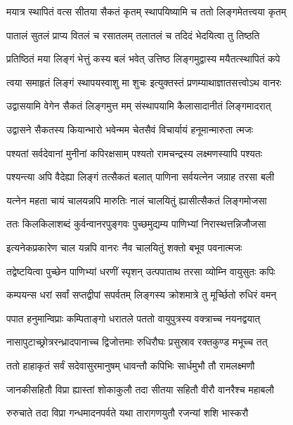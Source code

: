 \twolineshloka
{मयात्र स्थापितं वत्स सीतया सैकतं कृतम्}
{स्थापयिष्यामि च ततो लिङ्गमेतत्त्वया कृतम्}%

\twolineshloka
{पातालं सुतलं प्राप्य वितलं च रसातलम्}
{तलातलं च तदिदं भेदयित्वा तु तिष्ठति}%

\twolineshloka
{प्रतिष्ठितं मया लिङ्गं भेत्तुं कस्य बलं भवेत्}
{उत्तिष्ठ लिङ्गमुद्वास्य मयैतत्स्थापितं कपे}%

\twolineshloka
{त्वया समाहृतं लिङ्गं स्थापयस्वाशु मा शुचः}
{इत्युक्तस्तं प्रणम्याथाज्ञातसत्त्वोऽथ वानरः}%

\twolineshloka
{उद्वासयामि वेगेन सैकतं लिङ्गमुत्त मम्}
{संस्थापयामि कैलासादानीतं लिङ्गमादरात्}%

\twolineshloka
{उद्वासने सैकतस्य कियान्भारो भवेन्मम}
{चेतसैवं विचार्यायं हनूमान्मारुता त्मजः}%

\twolineshloka
{पश्यतां सर्वदेवानां मुनीनां कपिरक्षसाम्}
{पश्यतो रामचन्द्रस्य लक्ष्मणस्यापि पश्यतः}%

\twolineshloka
{पश्यन्त्या अपि वैदेह्या लिङ्गं तत्सैकतं बलात्}
{पाणिना सर्वयत्नेन जग्राह तरसा बली}%

\twolineshloka
{यत्नेन महता चायं चालयन्नपि मारुतिः}
{नालं चालयितुं ह्यासीत्सैकतं लिङ्गमोजसा}%

\twolineshloka
{ततः किलकिलाशब्दं कुर्वन्वानरपुङ्गवः}
{पुच्छमुद्यम्य पाणिभ्यां निरास्थत्तन्निजौजसा}%

\twolineshloka
{इत्यनेकप्रकारेण चाल यन्नपि वानरः}
{नैव चालयितुं शक्तो बभूव पवनात्मजः}%

\twolineshloka
{तद्वेष्टयित्वा पुच्छेन पाणिभ्यां धरणीं स्पृशन्}
{उत्पपाताथ तरसा व्योम्नि वायुसुतः कपिः}%

\twolineshloka
{कम्पयन्स धरां सर्वां सप्तद्वीपां सपर्वतम्}
{लिङ्गस्य क्रोशमात्रे तु मूर्च्छितो रुधिरं वमन्}%

\twolineshloka
{पपात हनुमान्विप्राः कम्पिताङ्गो धरातले}
{पततो वायुपुत्रस्य वक्त्राच्च नयनद्वयात्}%

\twolineshloka
{नासापुटाच्छ्रोत्ररन्ध्रादपानाच्च द्विजोत्तमाः}
{रुधिरौघः प्रसुस्राव रक्तकुण्ड मभूच्च तत्}%

\twolineshloka
{ततो हाहाकृतं सर्वं सदेवासुरमानुषम्}
{धावन्तौ कपिभिः सार्धमुभौ तौ रामलक्ष्मणौ}%

\twolineshloka
{जानकीसहितौ विप्रा ह्यास्तां शोकाकुलौ तदा}
{सीतया सहितौ वीरौ वानरैश्च महाबलौ}%

\twolineshloka
{रुरुचाते तदा विप्रा गन्धमादनपर्वते}
{यथा तारागणयुतौ रजन्यां शशि भास्करौ}%

